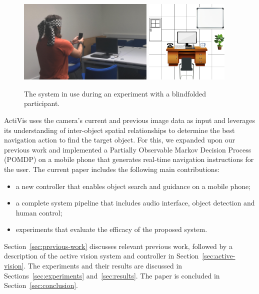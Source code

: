 \documentclass[runningheads]{llncs}
\begin{document}
\begin{figure}
  \centering
  \includegraphics[height=4cm]{figures/system_use.png} \hfil
  \includegraphics[height=4cm]{figures/object_grid/grid.png}
  \caption{The system in use during an experiment with a blindfolded participant. }\label{fig:system-in-use}
\end{figure}

ActiVis uses the camera's current and previous image data as input and leverages its understanding of inter-object spatial relationships to determine the best navigation action to find the target object.
For this, we expanded upon our previous work and implemented a Partially Observable Markov Decision Process (POMDP) on a mobile phone that generates real-time navigation instructions for the user.
The current paper includes the following main contributions:

\begin{itemize}
  \item a new controller that enables object search and guidance on a mobile phone;
  \item a complete system pipeline that includes audio interface, object detection and human control;
  \item experiments that evaluate the efficacy of the proposed system.
\end{itemize}

Section~\ref{sec:previous-work} discusses relevant previous work, followed by a description of the active vision system and controller in Section~\ref{sec:active-vision}.
The experiments and their results are discussed in Sections~\ref{sec:experiments} and~\ref{sec:results}.
The paper is concluded in Section~\ref{sec:conclusion}.
\end{document}
